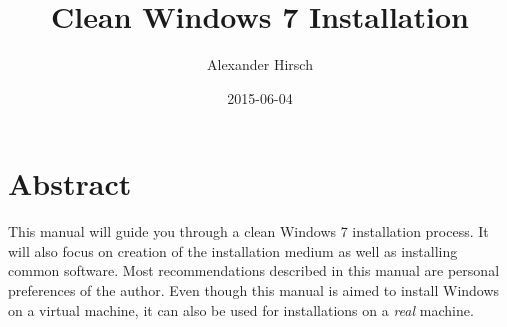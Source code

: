 \documentclass{itsarticle}
\title{Clean Windows 7 Installation}
\author{Alexander Hirsch}
\date{2015-06-04}
\begin{document}
\maketitle

\section*{Abstract}
\label{sec:abstract}

This manual will guide you through a clean Windows 7 installation process. It
will also focus on creation of the installation medium as well as installing
common software. Most recommendations described in this manual are personal
preferences of the author. Even though this manual is aimed to install Windows
on a virtual machine, it can also be used for installations on a \emph{real}
machine.
\end{document}
